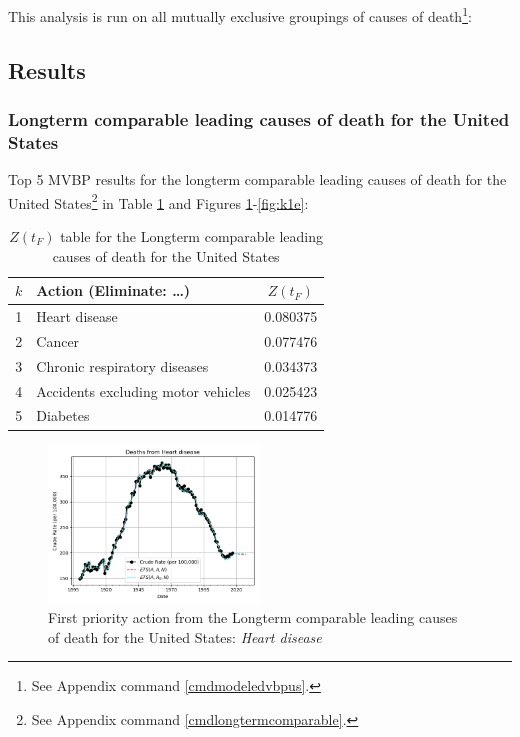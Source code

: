 \documentclass[10pt, a4paper, twocolumn]{IEEEconf}
\begin{document}
This analysis is run on all mutually exclusive groupings of causes of death\footnote{See Appendix command \ref{cmdmodeledvbpus}.}:

\clearpage

\subsection{Results}

\subsubsection{Longterm comparable leading causes of death for the United States}

Top 5 MVBP results for the longterm comparable leading causes of death for the United States\footnote{See Appendix command \ref{cmdlongtermcomparable}.} in Table \ref{table:ztable1} and Figures \ref{fig:k1a}-\ref{fig:k1e}:

\begin{table}[H]
  \centering
  \begin{tabular}{clc}
    \toprule
      $k$ & Action (Eliminate: \ldots) & $Z(t_F)$ \\
    \midrule
      1 &                      Heart disease & 0.080375 \\
      2 &                             Cancer & 0.077476 \\
      3 &       Chronic respiratory diseases & 0.034373 \\
      4 & Accidents excluding motor vehicles & 0.025423 \\
      5 &                           Diabetes & 0.014776 \\
    \bottomrule
  \end{tabular}
  \caption{$Z(t_F)$ table for the Longterm comparable leading causes of death for the United States}
  \label{table:ztable1}
\end{table}

\begin{figure}[H]
  \centering
  \includegraphics[width=0.5\textwidth]{results/US_ICD_LONGTERM_COMPARABLE_LEADING/Heart_disease_ets.png}
  \caption{First priority action from the Longterm comparable leading causes of death for the United States: \textit{Heart disease}}\label{fig:k1a}
\end{figure}
\end{document}
